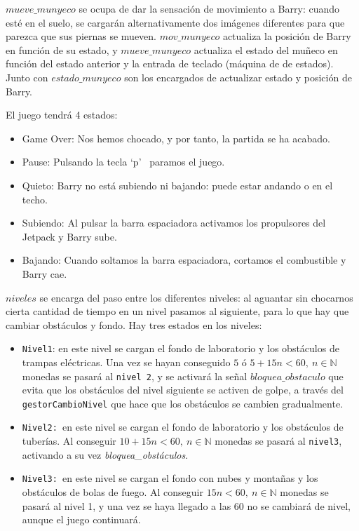\documentclass[11pt, a4paper, spanish, openright, twoside]{book}
\begin{document}
$mueve\_munyeco$ se ocupa de dar la sensación de movimiento a Barry: cuando esté en el suelo, se cargarán alternativamente dos imágenes diferentes para que parezca que sus piernas se mueven.
$mov\_munyeco$ actualiza la posición de Barry en función de su estado, y $mueve\_munyeco$ actualiza el estado del muñeco en función del estado anterior y la entrada de teclado (máquina de de estados). Junto con $estado\_munyeco$ son los encargados de actualizar estado y posición de Barry.

El juego tendrá 4 estados:
\begin{itemize}
\item Game Over: Nos hemos chocado, y por tanto, la partida se ha acabado.
\item Pause: Pulsando la tecla `p'  \ paramos el juego.
\item Quieto: Barry no está subiendo ni bajando: puede estar andando o en el techo.
\item Subiendo: Al pulsar la barra espaciadora activamos los propulsores del Jetpack y Barry sube.
\item Bajando: Cuando soltamos la barra espaciadora, cortamos el combustible y Barry cae.
\end{itemize}


$niveles$ se encarga del paso entre los diferentes niveles: al aguantar sin chocarnos cierta cantidad de tiempo en un nivel pasamos al siguiente, para lo que hay que cambiar obstáculos y fondo.
Hay tres estados en los niveles:
\begin{itemize}
\item \texttt{Nivel1}: en este nivel se cargan el fondo de laboratorio y los obstáculos de trampas eléctricas. Una vez se hayan conseguido $5$ ó  $5+15n<60,\ n\in\mathbb{N}$  monedas se pasará al \texttt{nivel 2}, y se activará la señal $bloquea\_obstaculo$ que evita que los obstáculos del nivel siguiente se activen de golpe, a través del \texttt{gestorCambioNivel} que hace que los obstáculos se cambien gradualmente. 
\item \texttt{Nivel2: }en este nivel se cargan el fondo de laboratorio y los obstáculos de tuberías. Al conseguir  $10+15n<60,\ n\in\mathbb{N}$ monedas se pasará al \texttt{nivel3}, activando a su vez \textit{bloquea\_obstáculos}.
\item \texttt{Nivel3: }en este nivel se cargan el fondo con nubes y montañas y los obstáculos de bolas de fuego. Al conseguir $15n<60,\ n\in\mathbb{N}$ monedas se pasará al nivel 1, y una vez se haya llegado a las 60 no se cambiará de nivel, aunque el juego continuará. 
\end{itemize}
\end{document}
